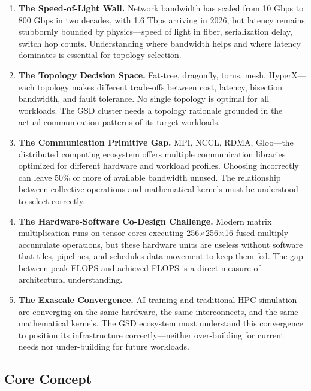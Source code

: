 \documentclass[11pt,letterpaper]{article}
\begin{document}
\begin{enumerate}[leftmargin=2em]
\item \textbf{The Speed-of-Light Wall.} Network bandwidth has scaled from 10 Gbps to 800 Gbps in two decades, with 1.6 Tbps arriving in 2026, but latency remains stubbornly bounded by physics---speed of light in fiber, serialization delay, switch hop counts. Understanding where bandwidth helps and where latency dominates is essential for topology selection.

\item \textbf{The Topology Decision Space.} Fat-tree, dragonfly, torus, mesh, HyperX---each topology makes different trade-offs between cost, latency, bisection bandwidth, and fault tolerance. No single topology is optimal for all workloads. The GSD cluster needs a topology rationale grounded in the actual communication patterns of its target workloads.

\item \textbf{The Communication Primitive Gap.} MPI, NCCL, RDMA, Gloo---the distributed computing ecosystem offers multiple communication libraries optimized for different hardware and workload profiles. Choosing incorrectly can leave 50\% or more of available bandwidth unused. The relationship between collective operations and mathematical kernels must be understood to select correctly.

\item \textbf{The Hardware-Software Co-Design Challenge.} Modern matrix multiplication runs on tensor cores executing 256$\times$256$\times$16 fused multiply-accumulate operations, but these hardware units are useless without software that tiles, pipelines, and schedules data movement to keep them fed. The gap between peak FLOPS and achieved FLOPS is a direct measure of architectural understanding.

\item \textbf{The Exascale Convergence.} AI training and traditional HPC simulation are converging on the same hardware, the same interconnects, and the same mathematical kernels. The GSD ecosystem must understand this convergence to position its infrastructure correctly---neither over-building for current needs nor under-building for future workloads.
\end{enumerate}

\subsection{Core Concept}
\end{document}
